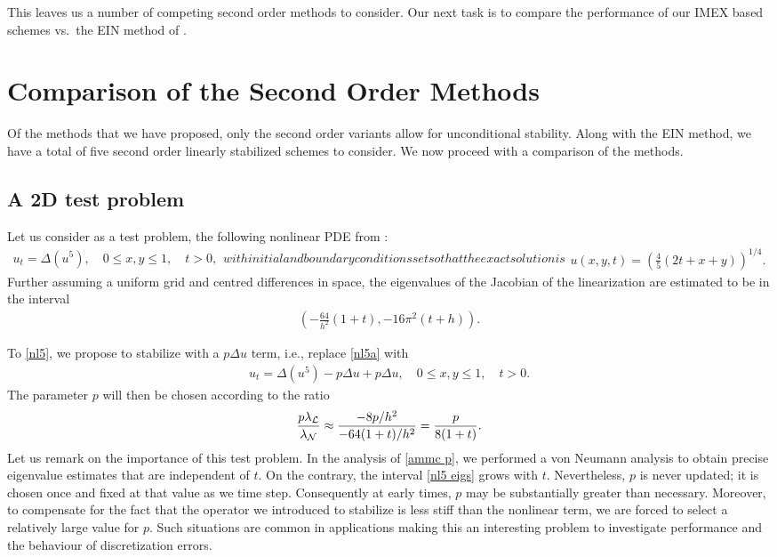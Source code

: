 This leaves us a number of competing second order methods to consider. Our next task is to compare the performance of our IMEX based schemes vs.\ the EIN method of \cite{duchemin2014explicit}.

\section{Comparison of the Second Order Methods}
Of the methods that we have proposed, only the second order variants allow for unconditional stability. Along with the EIN method, we have a total of five second order linearly stabilized schemes to consider. We now proceed with a comparison of the methods.

\subsection{A 2D test problem}
Let us consider as a test problem, the following nonlinear PDE from \cite{vdHouwen1982on}:
\begin{subequations}
        \begin{align}
                u_t = \Delta (u^5),
\quad 0\leq x,y\leq 1,
\quad t > 0,
\label{nl5a}
        \end{align}
with initial and boundary conditions set so that the exact solution is 
\begin{align}
u(x,y,t) = \left(\frac{4}{5}(2t+x+y)\right)^{1/4}.
\label{nl5b}
\end{align}
\label{nl5}%
\end{subequations}
Further assuming a uniform grid and centred differences in space, the eigenvalues of the Jacobian of the linearization are estimated to be in the interval
\begin{align}
        \left(-\frac{64}{h^2}(1+t), -16\pi^2(t+h) \right).
\label{nl5 eigs}
\end{align}

To \cref{nl5}, we propose to stabilize with a $p\Delta u$ term, i.e., replace \cref{nl5a} with 
\begin{align}
        u_t = \Delta (u^5) - p\Delta u + p\Delta u, \quad 0\leq x,y\leq 1,
\quad t > 0.
\label{nl5 p}
\end{align}
The parameter $p$ will then be chosen according to the ratio
\begin{align}
        \frac{p\lambda_{\mathcal{L}}}{\lambda_{\mathcal{N}}}
\approx \frac{-8p/h^2}{-64(1+t)/h^2}
= \frac{p}{8(1+t)}.
\end{align}
Let us remark on the importance of this test problem. In the analysis of \cref{ammc p}, we performed a von Neumann analysis to obtain precise eigenvalue estimates that are independent of $t$. On the contrary, the interval \cref{nl5 eigs} grows with $t$. Nevertheless, $p$ is never updated; it is chosen once and fixed at that value as we time step. Consequently at early times, $p$ may be substantially greater than necessary. Moreover, to compensate for the fact that the operator we introduced to stabilize is less stiff than the nonlinear term, we are forced to select a relatively large value for $p$. Such situations are common in applications making this an interesting problem to investigate performance and the behaviour of discretization errors.

